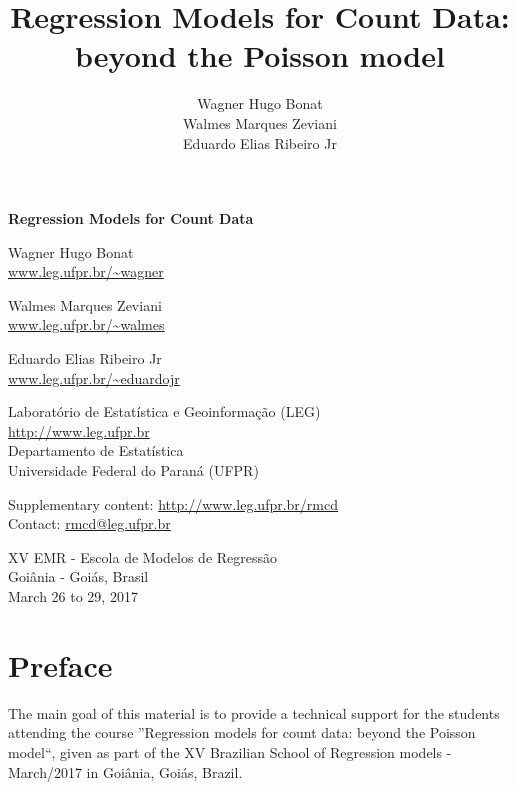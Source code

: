 \documentclass[9pt,a5paper,]{book}
\title{Regression Models for Count Data: beyond the Poisson model}
\author{Wagner Hugo Bonat \\ Walmes Marques Zeviani \\ Eduardo Elias Ribeiro Jr}
\date{}
\theoremstyle{definition}
\theoremstyle{definition}
\theoremstyle{remark}
\begin{document}
\maketitle

\thispagestyle{empty}
\cleardoublepage
\thispagestyle{empty}


\begin{flushleft}
  \Large \bf
  Regression Models for Count Data
\end{flushleft}
\vspace*{1.5em}

\begin{flushleft}
Wagner Hugo Bonat\\
\url{www.leg.ufpr.br/~wagner}

Walmes Marques Zeviani\\
\url{www.leg.ufpr.br/~walmes}

Eduardo Elias Ribeiro Jr\\
\url{www.leg.ufpr.br/~eduardojr}
\end{flushleft}
\vspace*{2em}

Laboratório de Estatística e Geoinformação (LEG)\\
\url{http://www.leg.ufpr.br}\\
Departamento de Estatística\\
Universidade Federal do Paraná (UFPR)

Supplementary content: \url{http://www.leg.ufpr.br/rmcd}\\
Contact: \url{rmcd@leg.ufpr.br}
\vspace*{\fill}

\begin{center}
XV EMR - Escola de Modelos de Regressão\\
Goiânia - Goiás, Brasil\\
March 26 to 29, 2017
\end{center}

\clearpage
\thispagestyle{empty}
\pagebreak

\setcounter{page}{1}

{
\setcounter{tocdepth}{1}
\tableofcontents
}
\chapter*{Preface}\label{preface}

The main goal of this material is to provide a technical support for the
students attending the course ''Regression models for count data: beyond
the Poisson model``, given as part of the XV Brazilian School of
Regression models - March/2017 in Goiânia, Goiás, Brazil.
\end{document}
